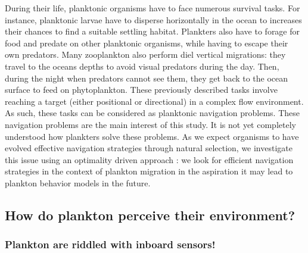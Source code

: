 During their life, planktonic organisms have to face numerous survival tasks.
For instance, planktonic larvae have to disperse horizontally in the ocean to increases their chances to find a suitable settling habitat.
Plankters also have to forage for food and predate on other planktonic organisms, while having to escape their own predators.
Many zooplankton also perform diel vertical migrations: they travel to the oceans depths to avoid visual predators during the day.
Then, during the night when predators cannot see them, they get back to the ocean surface to feed on phytoplankton.
These previously described tasks involve reaching a target (either positional or directional) in a complex flow environment.
As such, these tasks can be considered as planktonic navigation problems.
These navigation problems are the main interest of this study. 
It is not yet completely understood how plankters solve these problems.
As we expect organisms to have evolved effective navigation strategies through natural selection, we investigate this issue using an optimality driven approach \citep{smith2011optimality}: we look for efficient navigation strategies in the context of plankton migration in the aspiration it may lead to plankton behavior models in the future.

\subsection{How do plankton perceive their environment?}

\subsubsection{Plankton are riddled with inboard sensors!}

